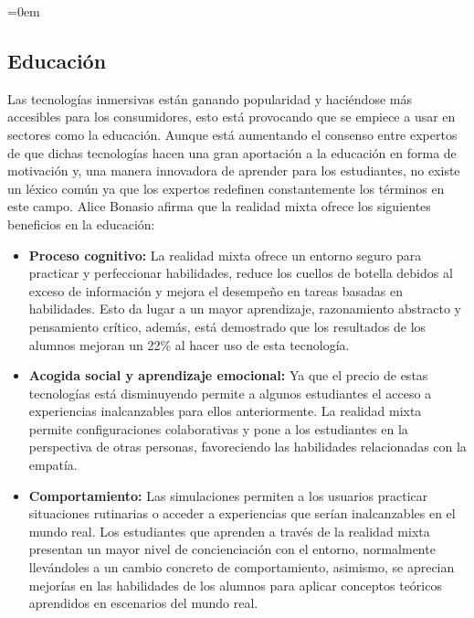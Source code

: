 \parindent=0em
\subsection{Educación}
\noindent

Las tecnologías inmersivas están ganando popularidad y haciéndose más accesibles para los consumidores, esto está provocando que se empiece a usar en sectores como la educación. Aunque está aumentando el consenso entre expertos de que dichas tecnologías hacen una gran aportación a la educación en forma de motivación y, una manera innovadora de aprender para los estudiantes, no existe un léxico común ya que los expertos redefinen constantemente los términos en este campo. Alice Bonasio \cite{microsoftEducation} afirma que la realidad mixta ofrece los siguientes beneficios en la educación:

\begin{itemize}
    \item \textbf{Proceso cognitivo:} La realidad mixta ofrece un entorno seguro para practicar y perfeccionar habilidades, reduce los cuellos de botella debidos al exceso de información y mejora el desempeño en tareas basadas en habilidades. Esto da lugar a un mayor aprendizaje, razonamiento abstracto y pensamiento crítico, además, está demostrado que los resultados de los alumnos mejoran un 22\% al hacer uso de esta tecnología. 
    
     \item \textbf{Acogida social y aprendizaje emocional:} Ya que el precio de estas tecnologías está disminuyendo permite a algunos estudiantes el acceso a experiencias inalcanzables para ellos anteriormente. La realidad mixta permite configuraciones colaborativas y pone a los estudiantes en la perspectiva de otras personas, favoreciendo las habilidades relacionadas con la empatía.
     
     \item \textbf{Comportamiento:} Las simulaciones permiten a los usuarios practicar situaciones rutinarias o acceder a experiencias que serían inalcanzables en el mundo real. Los estudiantes que aprenden a través de la realidad mixta presentan un mayor nivel de concienciación con el entorno, normalmente llevándoles a un cambio concreto de comportamiento, asimismo, se aprecian mejorías en las habilidades de los alumnos para aplicar conceptos teóricos aprendidos en escenarios del mundo real.
\end{itemize}

